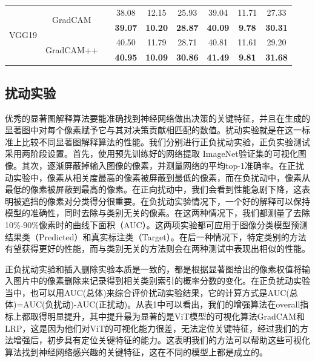 \begin{table}
{\begin{tabular}{ccccccccc}
			\hline
			\multirow{4}{*}{VGG19} & \multirow{2}{*}{GradCAM}                 &                       & 38.08          & 12.15          & 25.93          & 39.04          & 11.71          & 27.33           \\ 
			\cline{4-9}
			&                                          & \checkmark                     & \textbf{39.07} & \textbf{10.20} & \textbf{28.87} & \textbf{40.09} & \textbf{9.78}  & \textbf{30.31}  \\ 
			\cline{2-9}
			& \multirow{2}{*}{GradCAM++}               &                       & 40.50          & 11.79          & 28.71          & 40.81          & 11.61          & 29.20           \\ 
			\cline{4-9}
			&                                          & \checkmark                     & \textbf{40.95} & \textbf{10.09} & \textbf{30.86} & \textbf{41.49} & \textbf{9.81}  & \textbf{31.68}  \\
			\hline
		\end{tabular}
	}
\end{table}
\subsection{扰动实验}
优秀的显著图解释算法要能准确找到神经网络做出决策的关键特征，并且在生成的显著图中对每个像素赋予它与其对决策贡献相匹配的数值。扰动实验就是在这一标准上比较不同显著图解释算法的性能。我们分别进行正负扰动实验，正负实验测试采用两阶段设置。首先，使用预先训练好的网络提取 ImageNet验证集的可视化图像。其次，逐渐屏蔽掉输入图像的像素，并测量网络的平均top-1准确率。在正扰动实验中，像素从相关度最高的像素被屏蔽到最低的像素，而在负扰动中，像素从最低的像素被屏蔽到最高的像素。在正向扰动中，我们会看到性能急剧下降，这表明被遮挡的像素对分类得分很重要。在负扰动实验情况下，一个好的解释可以保持模型的准确性，同时去除与类别无关的像素。在这两种情况下，我们都测量了去除10\%-90\%像素时的曲线下面积（AUC）。这两项实验都可应用于图像分类模型预测结果类（Predicted）和真实标注类（Target）。在后一种情况下，特定类别的方法有望获得更好的性能，而与类别无关的方法则会在两种测试中表现出相似的性能。

正负扰动实验和插入删除实验本质是一致的，都是根据显著图给出的像素权值将输入图片中的像素删除来记录得到相关类别索引的概率分数的变化。在正负扰动实验当中，也可以用AUC(总体)来综合评价扰动实验结果，它的计算方式是AUC(总体)=AUC(负扰动)-AUC(正扰动)。从表1中可以看出，我们的增强算法在overall指标上都取得明显提升，其中提升最为显著的是ViT模型的可视化算法GradCAM和LRP，这是因为他们对ViT的可视化能力很差，无法定位关键特征，经过我们的方法增强后，初步具有定位关键特征的能力。这表明我们的方法可以帮助这些可视化算法找到神经网络感兴趣的关键特征，这在不同的模型上都是成立的。

